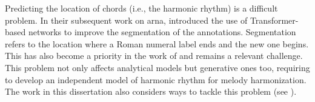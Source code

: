 

Predicting the location of chords (i.e., the harmonic
rhythm) is a difficult problem. In their subsequent work on
\gls{arna}, \textcite{chen2019harmony,chen2021attend}
introduced the use of Transformer-based networks
\parencite{vaswani2017attention} to improve the segmentation
of the annotations. Segmentation refers to the location
where a Roman numeral label ends and the new one begins.
This has also become a priority in the work of
\textcite{micchi2021deep} and remains a relevant challenge.
This problem not only affects analytical models but
generative ones too, requiring \textcite{wu2021melody} to
develop an independent model of harmonic rhythm for melody
harmonization. The work in this dissertation also considers
ways to tackle this problem (see
).
